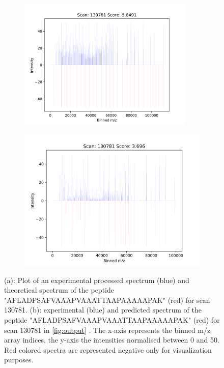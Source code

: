 \documentclass[11pt]{article}
\begin{document}
\begin{figure}
\centering
\begin{subfigure}[b]{1\textwidth}
\centering
    \includegraphics[width=0.92\textwidth]{figs/scan_130781_ps=False_.png}
   \caption{}
   \label{fig:theo} 
\end{subfigure}
\begin{subfigure}[b]{1\textwidth}
\centering
   \includegraphics[width=0.92
   \textwidth]{figs/scan_130781_ps=True_HCD.png}
   \caption{}
   \label{fig:predict}
\end{subfigure}

\caption{(a): Plot of an experimental processed spectrum (blue) and theoretical spectrum of the peptide "AFLADPSAFVAAAPVAAATTAAPAAAAAPAK" (red) for scan 130781. (b): experimental (blue) and predicted spectrum of the peptide "AFLADPSAFVAAAPVAAATTAAPAAAAAPAK" (red) for scan 130781 in \cref{fig:output} . The x-axis represents the binned m/z array indices, the y-axis the intensities normalised between 0 and 50. Red colored spectra are represented negative only for visualization purposes.}
\label{fig:scan130781}
\end{figure}
\end{document}
